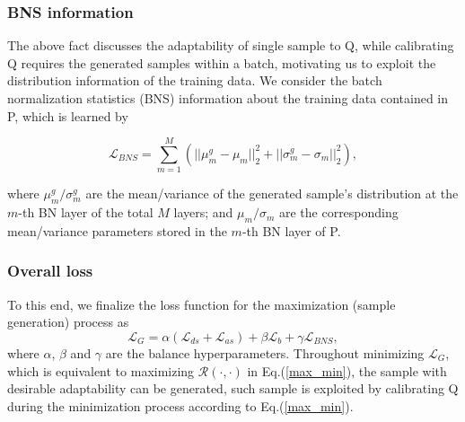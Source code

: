 \subsubsection{BNS information}
The above fact discusses the adaptability of single sample to Q, while calibrating Q requires the generated samples within a batch, motivating us to exploit the distribution information of the training data.
We consider the batch normalization statistics (BNS) information \cite{xu2020generative,choi2021qimera} about the training data contained in P, which is learned by
\begin{small}
\begin{equation}
\mathcal{L}_{BNS}=\sum^M_{m=1}( ||\mu^g_m-\mu_m||^2_2 + ||\sigma^g_m-\sigma_m||^2_2 ),
\label{bns}
\end{equation}
\end{small}
where $\mu^g_m / \sigma^g_m$ are the mean/variance of the generated sample's distribution at the $m$-th BN layer of the total $M$ layers; and $\mu_m / \sigma_m$ are the corresponding mean/variance parameters stored in the $m$-th BN layer of P.

\subsubsection{Overall loss}
To this end, we finalize the loss function for the maximization (sample generation) process as
\begin{equation}
\mathcal{L}_G=  \alpha (\mathcal{L}_{ds}+ \mathcal{L}_{as}) + \beta \mathcal{L}_b+ \gamma \mathcal{L}_{BNS},
\label{generator_loss}
\end{equation}
where $\alpha$, $\beta$ and $\gamma$ are the balance hyperparameters.
Throughout minimizing $\mathcal{L}_G$, which is equivalent to maximizing $\mathcal{R}(\cdot,\cdot)$ in Eq.(\ref{max_min}), the sample with desirable adaptability can be generated, such sample is exploited by calibrating Q during the minimization process according to Eq.(\ref{max_min}).







